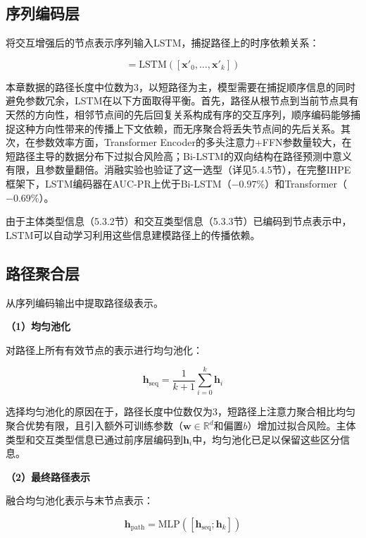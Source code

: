 \subsection{序列编码层}

将交互增强后的节点表示序列输入LSTM\cite{hochreiter1997long}，捕捉路径上的时序依赖关系：

\begin{equation}
[\mathbf{h}_0, \ldots, \mathbf{h}_k] = \text{LSTM}([\mathbf{x}'_0, \ldots, \mathbf{x}'_k])
\end{equation}

本章数据的路径长度中位数为3，以短路径为主，模型需要在捕捉顺序信息的同时避免参数冗余，LSTM在以下方面取得平衡。首先，路径从根节点到当前节点具有天然的方向性，相邻节点间的先后回复关系构成有序的交互序列，顺序编码能够捕捉这种方向性带来的传播上下文依赖，而无序聚合将丢失节点间的先后关系。其次，在参数效率方面，Transformer Encoder的多头注意力+FFN参数量较大，在短路径主导的数据分布下过拟合风险高；Bi-LSTM的双向结构在路径预测中意义有限，且参数量翻倍。消融实验也验证了这一选型（详见5.4.5节），在完整IHPE框架下，LSTM编码器在AUC-PR上优于Bi-LSTM（$-0.97\%$）和Transformer（$-0.69\%$）。

由于主体类型信息（5.3.2节）和交互类型信息（5.3.3节）已编码到节点表示中，LSTM可以自动学习利用这些信息建模路径上的传播依赖。

\subsection{路径聚合层}

从序列编码输出中提取路径级表示。

\textbf{（1）均匀池化}

对路径上所有有效节点的表示进行均匀池化：

\begin{equation}
\mathbf{h}_{\text{seq}} = \frac{1}{k+1}\sum_{i=0}^{k} \mathbf{h}_i
\end{equation}

选择均匀池化的原因在于，路径长度中位数仅为3，短路径上注意力聚合相比均匀聚合优势有限\cite{maini2020pool}，且引入额外可训练参数（$\mathbf{w} \in \mathbb{R}^d$和偏置$b$）增加过拟合风险。主体类型和交互类型信息已通过前序层编码到$\mathbf{h}_i$中，均匀池化已足以保留这些区分信息。

\textbf{（2）最终路径表示}

融合均匀池化表示与末节点表示：

\begin{equation}
\mathbf{h}_{\text{path}} = \text{MLP}([\mathbf{h}_{\text{seq}}; \mathbf{h}_k])
\end{equation}

